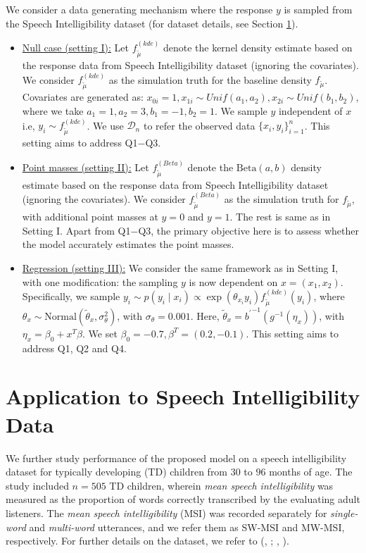 \documentclass{article}[12pt]
\newcommand{\citeb}[2]{(\href{cite.#1}{\citeauthor{#1}}, \href{cite.#1}{\textcolor{blue} {\citeyear{#1}}}; \href{cite.#2}{\citeauthor{#2}}, \href{cite.#2}{\textcolor{blue} {\citeyear{#2}}})} %
\newcommand{\refa}[1]{\textcolor{blue}{\ref{#1}}} %
\newcommand{\tmu}{\widetilde{\mu}}
\begin{document}
We consider a data generating mechanism where the response $y$ is sampled from the Speech Intelligibility dataset (for dataset details, see Section \refa{sec:ex}).
\begin{itemize}
    \item \underline{Null case (setting I):} Let $f^{(kde)}_{\tmu}$ denote the kernel density estimate based on the response data from Speech Intelligibility dataset (ignoring the covariates). We consider $f^{(kde)}_{\tmu}$ as the simulation truth for the baseline density $f_{\tmu}$. Covariates are generated as: $x_{0i} = 1, x_{1i} \sim Unif(a_1, a_2), x_{2i} \sim Unif(b_1, b_2)$, where we take $a_1 = 1, a_2 = 3, b_1 = -1, b_2 = 1$. We sample $y$ independent of $x$ i.e, $y_i \sim f^{(kde)}_{\tmu}$. We use $\mathcal{D}_n$ to refer the observed data $\{x_i, y_i\}_{i=1}^n$. This setting aims to address Q1$-$Q3.    

    \item \underline{Point masses (setting II):} Let $f^{(Beta)}_{\tmu}$ denote the $\text{Beta}(a,b)$ density estimate based on the response data from Speech Intelligibility dataset (ignoring the covariates). We consider $f^{(Beta)}_{\tmu}$ as the simulation truth for $f_{\tmu}$, with additional point masses at $y = 0$ and $y = 1$. The rest is same as in Setting I. Apart from Q1$-$Q3, the primary objective here is to assess whether the model accurately estimates the point masses. 

    \item \underline{Regression (setting III):} We consider the same framework as in Setting I, with one modification: the sampling $y$ is now dependent on $x = (x_1, x_2)$. Specifically, we sample $y_i \sim p(y_i \mid x_i) \propto \exp(\theta_{x_i} y_i)f^{(kde)}_{\tmu}(y_i)$, where $\theta_x \sim \text{Normal}(\widetilde \theta_x, \sigma^2_\theta)$, with $\sigma_\theta = 0.001$. Here, $\widetilde \theta_x = {b^\prime}^{-1}(g^{-1}(\eta_x))$, with $\eta_x = \beta_0 + x^T\beta$. We set $\beta_0 = -0.7, \beta^T = (0.2, -0.1)$. This setting aims to address Q1, Q2 and Q4.
\end{itemize}



\section{Application to Speech Intelligibility Data}
\label{sec:ex}
We further study performance of the proposed model on a speech intelligibility dataset for typically developing (TD) children from $30$ to $96$ months of age. The study included $n = 505$ TD children, wherein \textit{mean speech intelligibility} was measured as the proportion of words correctly transcribed by the evaluating adult listeners. The \textit{mean speech intelligibility} (MSI) was recorded separately for \textit{single-word} and \textit{multi-word} utterances, and we refer them as SW-MSI and MW-MSI, respectively. For further details on the dataset, we refer to \citeb{mahr:2020}{hustad:2021}.
\end{document}
